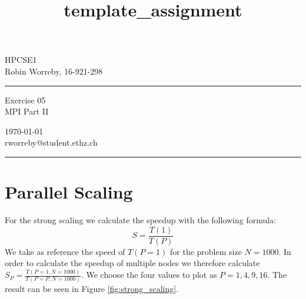 \documentclass[a4paper,10pt]{article} %
\begin{document}

\title{template_assignment} %
\fancyhead[C]{}
\begin{minipage}{0.295\textwidth} %
\raggedright
HPCSE1\\ %
\footnotesize %
Robin Worreby, 16-921-298 %
\medskip\hrule
\end{minipage}
\begin{minipage}{0.4\textwidth} %
\centering 
\large %
Exercise 05\\ %
\normalsize %
MPI Part II %
\end{minipage}
\begin{minipage}{0.295\textwidth} %
\raggedleft
\today\\ %
\footnotesize %
rworreby@student.ethz.ch%
\medskip\hrule
\end{minipage}


\setcounter{section}{0}

\section{Parallel Scaling}

For the strong scaling we calculate the speedup with the following formula:
\begin{equation}\label{speedup}
    S = \frac{T(1)}{T(P)}
\end{equation}
We take as reference the speed of $T(P=1)$ for the problem size $N=1000$. In order to calculate the speedup of multiple nodes we therefore calculate $S_P = \frac{T(P=1, N=1000)}{T(P=P, N=1000)}$. We choose the four values to plot as $P={1, 4, 9, 16}$. The result can be seen in Figure \ref{fig:strong_scaling}.
\end{document}
